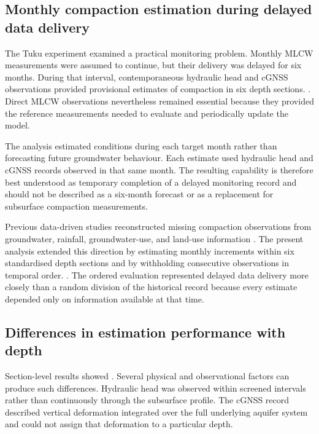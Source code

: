 \subsection{Monthly compaction estimation during delayed data delivery}
\label{subsec:discussion_delay_v2}

The Tuku experiment examined a practical monitoring problem. Monthly MLCW measurements were assumed to continue, but their delivery was delayed for six months. During that interval, contemporaneous hydraulic head and cGNSS observations provided provisional estimates of compaction in six depth sections. . Direct MLCW observations nevertheless remained essential because they provided the reference measurements needed to evaluate and periodically update the model.

The analysis estimated conditions during each target month rather than forecasting future groundwater behaviour. Each estimate used hydraulic head and cGNSS records observed in that same month. The resulting capability is therefore best understood as temporary completion of a delayed monitoring record and should not be described as a six-month forecast or as a replacement for subsurface compaction measurements.

Previous data-driven studies reconstructed missing compaction observations from groundwater, rainfall, groundwater-use, and land-use information \citep{liu_reconstructing_2023, liu_deep_2025}. The present analysis extended this direction by estimating monthly increments within six standardised depth sections and by withholding consecutive observations in temporal order. . The ordered evaluation represented delayed data delivery more closely than a random division of the historical record because every estimate depended only on information available at that time.

\subsection{Differences in estimation performance with depth}
\label{subsec:discussion_depth_v2}

Section-level results showed . Several physical and observational factors can produce such differences. Hydraulic head was observed within screened intervals rather than continuously through the subsurface profile. The cGNSS record described vertical deformation integrated over the full underlying aquifer system and could not assign that deformation to a particular depth.

